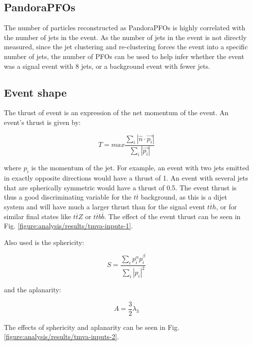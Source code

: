 \subsection{PandoraPFOs}
\label{section:pfos}
The number of particles reconstructed as Pandora\acrshort{PFO}s is highly correlated with the number of jets in the event. As the number of jets in the event is not directly measured, since the jet clustering and re-clustering forces the event into a specific number of jets, the number of \acrshort{PFO}s can be used to help infer whether the event was a signal event with 8 jets, or a background event with fewer jets.

\subsection{Event shape}
\label{section:event-shape}
The thrust of event is an expression of the net momentum of the event. An event's thrust is given by:

\begin{equation}
	T = max \frac{\sum_i | \hat{n} \cdot \overrightarrow{p_i} |}{\sum_i | \overrightarrow{p_i} |}
\label{eq:thrust}
\end{equation}

where $p_i$ is the momentum of the jet. For example, an event with two jets emitted in exactly opposite directions would have a thrust of 1. An event with several jets that are spherically symmetric would have a thrust of 0.5. The event thrust is thus a good discriminating variable for the $t\overline{t}$ background, as this is a dijet system and will have much a larger thrust than for the signal event $t\overline{t}h$, or for similar final states like $t\overline{t}Z$ or $t\overline{t}b\overline{b}$. The effect of the event thrust can be seen in Fig. \ref{figure:analysis/results/tmva-inputs-1}.

Also used is the sphericity:

\begin{equation}
	S = \frac{\sum_i p_i^{\alpha} p_i^{\beta}}{\sum_i | p_i |^2}
\label{eq:sphericity}
\end{equation}

and the aplanarity:

\begin{equation}
	A = \frac{3}{2}\lambda_3
\label{eq:aplanarity}
\end{equation}

The effects of sphericity and aplanarity can be seen in Fig. \ref{figure:analysis/results/tmva-inputs-2}.

